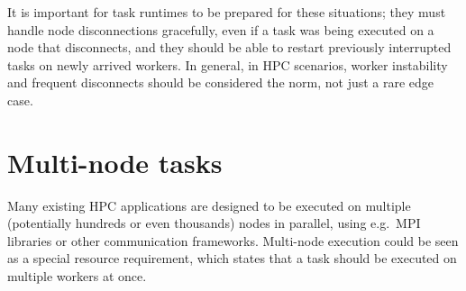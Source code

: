 It is important for task runtimes to be prepared for these situations; they must handle node
disconnections gracefully, even if a task was being executed on a node that disconnects, and they
should be able to restart previously interrupted tasks on newly arrived workers. In general, in HPC
scenarios, worker instability and frequent disconnects should be considered the norm, not just a
rare edge case.


\section{Multi-node tasks}
Many existing HPC applications are designed to be executed on multiple (potentially hundreds or
even thousands) nodes in parallel, using e.g.\ MPI libraries or other communication frameworks.
Multi-node execution could be seen as a special resource requirement, which states that a task
should be executed on multiple workers at once.

